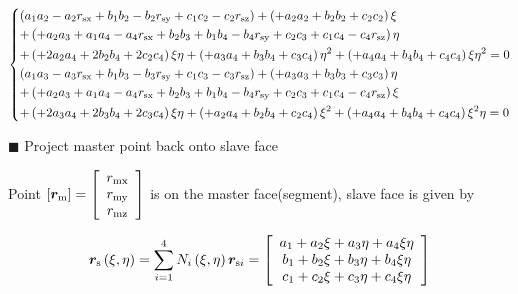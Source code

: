 \begin{equation}
\left\{ \begin{gathered}
  \left( {{a_1}{a_2} - {a_2}{r_{{\text{sx}}}} + {b_1}{b_2} - {b_2}{r_{{\text{sy}}}} + {c_1}{c_2} - {c_2}{r_{{\text{sz}}}}} \right) + \left( { + {a_2}{a_2} + {b_2}{b_2} + {c_2}{c_2}} \right)\xi  \hfill \\
   + \left( { + {a_2}{a_3} + {a_1}{a_4} - {a_4}{r_{{\text{sx}}}} + {b_2}{b_3} + {b_1}{b_4} - {b_4}{r_{{\text{sy}}}} + {c_2}{c_3} + {c_1}{c_4} - {c_4}{r_{{\text{sz}}}}} \right)\eta  \hfill \\
   + \left( { + 2{a_2}{a_4} + 2{b_2}{b_4} + 2{c_2}{c_4}} \right)\xi \eta  + \left( { + {a_3}{a_4} + {b_3}{b_4} + {c_3}{c_4}} \right){\eta ^2} + \left( { + {a_4}{a_4} + {b_4}{b_4} + {c_4}{c_4}} \right)\xi {\eta ^2} = 0 \hfill \\
  \left( {{a_1}{a_3} - {a_3}{r_{{\text{sx}}}} + {b_1}{b_3} - {b_3}{r_{{\text{sy}}}} + {c_1}{c_3} - {c_3}{r_{{\text{sz}}}}} \right) + \left( { + {a_3}{a_3} + {b_3}{b_3} + {c_3}{c_3}} \right)\eta  \hfill \\
   + \left( { + {a_2}{a_3} + {a_1}{a_4} - {a_4}{r_{{\text{sx}}}} + {b_2}{b_3} + {b_1}{b_4} - {b_4}{r_{{\text{sy}}}} + {c_2}{c_3} + {c_1}{c_4} - {c_4}{r_{{\text{sz}}}}} \right)\xi  \hfill \\
   + \left( { + 2{a_3}{a_4} + 2{b_3}{b_4} + 2{c_3}{c_4}} \right)\xi \eta  + \left( { + {a_2}{a_4} + {b_2}{b_4} + {c_2}{c_4}} \right){\xi ^2} + \left( { + {a_4}{a_4} + {b_4}{b_4} + {c_4}{c_4}} \right){\xi ^2}\eta  = 0 \hfill \\ 
\end{gathered}  \right.
\end{equation}

\noindent $\blacksquare$ Project master point back onto slave face

Point $\left[ {\bm{r}}_{\rm{m}} \right] = \left[ {\begin{array}{c} {r_{\rm{mx}}} \\ {r_{\rm{my}}} \\ {r_{\rm{mz}}} \end{array}} \right]$ is on the master face(segment), slave face is given by

\begin{equation} \label{eq_rsxieta}
{{\bm{r}}_{\rm{s}}}\left( {\xi ,\eta } \right) = \sum\limits_{i = 1}^4 {{N_i}\left( {\xi ,\eta } \right){{\bm{r}}_{{\rm{s}}i}}}  = \left[ {\begin{array}{c}
  {{a_1} + {a_2}\xi  + {a_3}\eta  + {a_4}\xi \eta } \\ 
  {{b_1} + {b_2}\xi  + {b_3}\eta  + {b_4}\xi \eta } \\ 
  {{c_1} + {c_2}\xi  + {c_3}\eta  + {c_4}\xi \eta } 
\end{array}} \right]
\end{equation}

